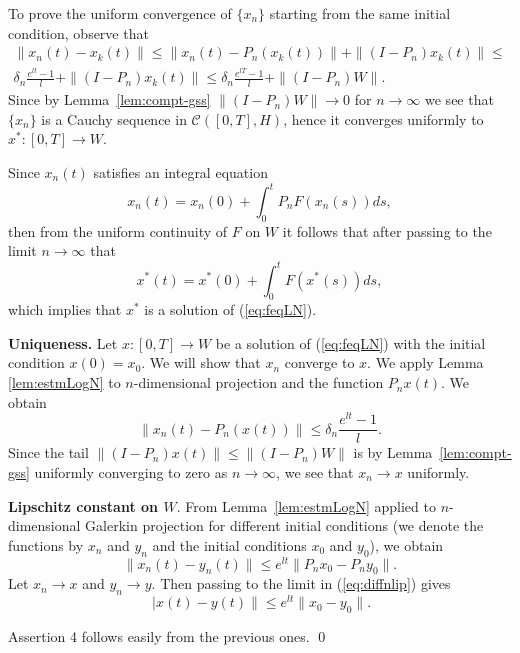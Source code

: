 To prove the uniform convergence of $\{x_n\}$ starting from the
same initial condition,  observe that
\begin{eqnarray*}
 \|x_n(t) - x_k(t)\| \leq  \|x_n(t) - P_n(x_k(t))\| + \|(I-P_n) x_k(t)\| \leq \\
    \delta_n \frac{e^{lt} - 1}{l} + \|(I-P_n) x_k(t)\| \leq
     \delta_n \frac{e^{lT} - 1}{l} + \|(I-P_n)W\|.
\end{eqnarray*}
Since by Lemma~\ref{lem:compt-gss} $\|(I-P_n)W\| \to 0$ for $n \to \infty$ we see
 that $\{x_n\}$ is a Cauchy sequence in $\mathcal{C}([0,T],H)$, hence it converges uniformly to $x^*:[0,T]\to W$.

Since $x_n(t)$ satisfies an integral equation
\begin{equation*}
  x_n(t)=x_n(0) + \int_0^t P_n F(x_n(s))ds,
\end{equation*}
then from the uniform continuity of $F$ on $W$ it follows that after passing to the limit $n \to \infty$ that
\begin{equation*}
  x^*(t)=x^*(0) + \int_0^t  F(x^*(s))ds,
\end{equation*}
which implies that $x^*$ is a solution of (\ref{eq:feqLN}).


\textbf{Uniqueness.} Let $x:[0,T] \to W$ be a solution of
(\ref{eq:feqLN}) with the initial condition $x(0)=x_0$. We will
show that $x_n $ converge to $x$. We apply Lemma
\ref{lem:estmLogN} to $n$-dimensional projection and the function
$P_n x(t)$. We obtain
\begin{equation}
  \|x_n(t) - P_n(x(t))\| \leq  \delta_n \frac{e^{lt} - 1}{l}.
\end{equation}
Since the tail $\|(I-P_n)x(t)\| \leq \|(I-P_n)W\|$ is by Lemma~\ref{lem:compt-gss} uniformly converging to zero as $n
\to \infty $, we see that $x_n \to x$ uniformly.


\textbf{Lipschitz constant on $W$}. From Lemma~\ref{lem:estmLogN}
applied to $n$-dimensional Galerkin projection for different
initial conditions (we denote the functions by $x_n$ and $y_n$ and
the initial conditions $x_0$ and $y_0$), we obtain
\begin{equation}
  \|x_n(t) - y_n(t)\| \leq e^{lt}\|P_n x_0 - P_n y_0\|.
  \label{eq:diffnlip}
\end{equation}
Let $x_n \to x$ and $y_n \to y$. Then passing to the limit in
(\ref{eq:diffnlip}) gives
\begin{equation}
  \ |x(t) - y(t)\| \leq e^{lt}\|x_0 - y_0\|.
\end{equation}

Assertion 4 follows easily from the previous ones. \qed
